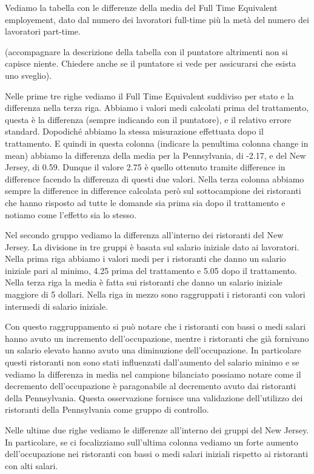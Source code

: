 \documentclass{article}
\begin{document}
Vediamo  la tabella con le differenze della media del Full Time Equivalent employement, dato dal numero dei lavoratori full-time più la metà del numero dei lavoratori part-time.

(accompagnare la descrizione della tabella con il puntatore altrimenti non si capisce niente. Chiedere anche se il puntatore si vede per assicurarsi che esista uno sveglio).

Nelle prime tre righe vediamo il Full Time Equivalent suddiviso per stato e la differenza nella terza riga.  Abbiamo i valori medi calcolati prima del trattamento, questa è la differenza (sempre indicando con il puntatore), e il relativo errore standard. Dopodiché abbiamo la stessa misurazione effettuata dopo il trattamento. E quindi in questa colonna (indicare la penultima colonna change in mean)  abbiamo la differenza della media per la Pennsylvania, di -2.17, e del New Jersey, di 0.59. Dunque il valore 2.75 è quello ottenuto tramite difference in difference facendo la differenza di questi due valori. Nella terza colonna abbiamo sempre la difference in difference calcolata però sul sottocampione dei ristoranti che hanno risposto ad tutte le domande sia prima sia dopo il trattamento e notiamo come l'effetto sia lo stesso.

Nel secondo gruppo vediamo la differenza all'interno dei ristoranti del New Jersey. La divisione in tre gruppi è basata sul salario iniziale dato ai lavoratori. Nella prima riga abbiamo i valori medi per i ristoranti che danno un salario iniziale pari al minimo, 4.25 prima del trattamento e 5.05 dopo il trattamento. Nella terza riga la media è fatta sui ristoranti che danno un salario iniziale maggiore di 5 dollari. Nella riga in mezzo sono raggruppati i ristoranti con valori intermedi di salario iniziale.

Con questo raggruppamento si può notare che i ristoranti con bassi o medi salari hanno avuto un incremento dell'occupazione, mentre i ristoranti che già fornivano un salario elevato hanno avuto una diminuzione dell'occupazione. In particolare questi ristoranti non sono stati influenzati dall'aumento del salario minimo e se vediamo la differenza in media nel campione bilanciato possiamo notare come il decremento dell'occupazione è paragonabile al decremento avuto dai ristoranti della Pennsylvania. Questa osservazione fornisce una validazione dell'utilizzo dei ristoranti della Pennsylvania come gruppo di controllo.

Nelle ultime due righe vediamo le differenze all'interno dei gruppi del New Jersey. In particolare, se ci focalizziamo sull'ultima colonna vediamo un forte aumento dell'occupazione nei ristoranti con bassi o medi salari iniziali rispetto ai ristoranti con alti salari.
\end{document}
